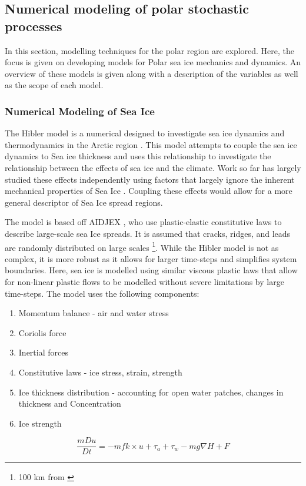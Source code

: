 \subsection{Numerical modeling of polar stochastic processes}

In this section, modelling techniques for the polar region are explored. Here, the focus is given on developing models for Polar sea ice mechanics and dynamics. An overview of these models is given along with a description of the variables as well as the scope of each model.

\subsubsection{Numerical Modeling of Sea Ice}

The Hibler model is a numerical designed to investigate sea ice dynamics and thermodynamics in the Arctic region \cite{hibler1979dynamic}. This model attempts to couple the sea ice dynamics to Sea ice thickness and uses this relationship to investigate the relationship between the effects of sea ice and the climate. Work so far has largely studied these effects independently using factors that largely ignore the inherent mechanical properties of Sea Ice \cite{hibler1979dynamic}. Coupling these effects would allow for a more general descriptor of Sea Ice spread regions.\par

The model is based off \textcite{coon1974modeling} AIDJEX \cite{hibler1979dynamic}, who use plastic-elastic constitutive laws to describe large-scale sea Ice spreads. It is assumed that cracks, ridges, and leads are randomly distributed on large scales \footnote{100 km from \textcite{coon2007arctic}}. While the Hibler model is not as complex, it is more robust as it allows for larger time-steps and simplifies system boundaries. Here, sea ice is modelled using similar viscous plastic laws \cite{hibler1979dynamic} that allow for non-linear plastic flows to be modelled without severe limitations by large time-steps. The model uses the following components:

\begin{enumerate}
     \item    Momentum balance  - air and water stress
     \item    Coriolis force
     \item    Inertial forces
     \item    Constitutive laws - ice stress, strain, strength
     \item    Ice thickness distribution - accounting for open water patches, changes in thickness and Concentration
     \item    Ice strength 
\end{enumerate}
\begin{equation}
\frac{mDu}{Dt} = -mfk\times u +\tau_a +\tau_w -mg \nabla H +F 
\end{equation}

